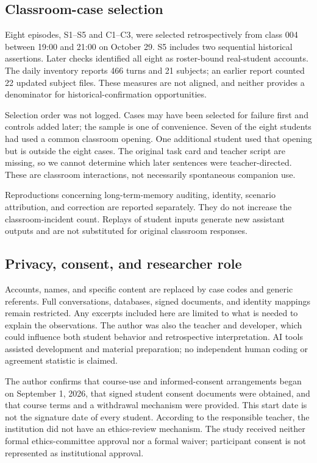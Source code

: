 \documentclass[11pt,a4paper]{article}
\begin{document}
\subsection{Classroom-case selection}
Eight episodes, S1--S5 and C1--C3, were selected retrospectively from class 004 between 19:00 and 21:00 on October 29. S5 includes two sequential historical assertions. Later checks identified all eight as roster-bound real-student accounts. The daily inventory reports 466 turns and 21 subjects; an earlier report counted 22 updated subject files. These measures are not aligned, and neither provides a denominator for historical-confirmation opportunities.

Selection order was not logged. Cases may have been selected for failure first and controls added later; the sample is one of convenience. Seven of the eight students had used a common classroom opening. One additional student used that opening but is outside the eight cases. The original task card and teacher script are missing, so we cannot determine which later sentences were teacher-directed. These are classroom interactions, not necessarily spontaneous companion use.

Reproductions concerning long-term-memory auditing, identity, scenario attribution, and correction are reported separately. They do not increase the classroom-incident count. Replays of student inputs generate new assistant outputs and are not substituted for original classroom responses.

\subsection{Privacy, consent, and researcher role}
Accounts, names, and specific content are replaced by case codes and generic referents. Full conversations, databases, signed documents, and identity mappings remain restricted. Any excerpts included here are limited to what is needed to explain the observations. The author was also the teacher and developer, which could influence both student behavior and retrospective interpretation. AI tools assisted development and material preparation; no independent human coding or agreement statistic is claimed.

The author confirms that course-use and informed-consent arrangements began on September 1, 2026, that signed student consent documents were obtained, and that course terms and a withdrawal mechanism were provided. This start date is not the signature date of every student. According to the responsible teacher, the institution did not have an ethics-review mechanism. The study received neither formal ethics-committee approval nor a formal waiver; participant consent is not represented as institutional approval.
\end{document}
